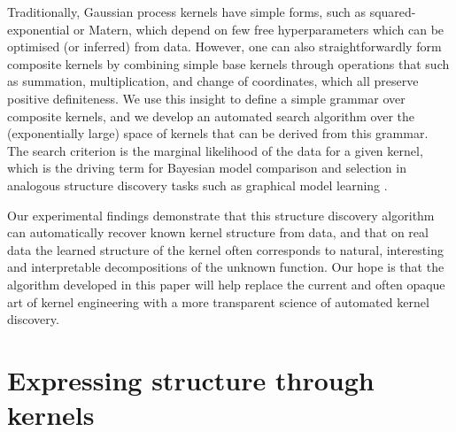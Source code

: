 \documentclass[twoside]{article}
\begin{document}
Traditionally, Gaussian process kernels have simple forms, such as squared-exponential or Matern, which depend on few free hyperparameters which can be optimised (or inferred) from data.
However, one can also straightforwardly form composite kernels by combining simple base kernels through operations that such as summation, multiplication, and change of coordinates, which all preserve positive definiteness.
We use this insight to define a simple grammar over composite kernels, and we develop an automated search algorithm over the (exponentially large) space of kernels that can be derived from this grammar.
The search criterion is the marginal likelihood of the data for a given kernel, which is the driving term for Bayesian model comparison and selection in analogous structure discovery tasks such as graphical model learning \cite{heckerman1995learning}.


Our experimental findings demonstrate that this structure discovery algorithm can automatically recover known kernel structure from data, and that on real data the learned structure of the kernel often corresponds to natural, interesting and interpretable decompositions of the unknown function.
Our hope is that the algorithm developed in this paper will help replace the current and often opaque art of kernel engineering with a more transparent science of automated kernel discovery.


\section{Expressing structure through kernels}
\label{sec:Structure}
\end{document}
